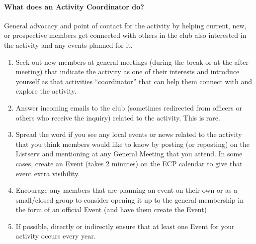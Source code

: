 \documentclass[10pt,a4paper]{article}
\begin{document}
\paragraph{What does an Activity Coordinator do?}
General advocacy and point of contact for the activity by helping current, new, or prospective members
get connected with others in the club also interested in the activity and any events planned for it.
\begin{enumerate}
\item Seek out new members at general meetings (during the break or at the after-meeting) that
indicate the activity as one of their interests and introduce yourself as that activities
“coordinator” that can help them connect with and explore the activity.
\item Answer incoming emails to the club (sometimes redirected from officers or others who receive
the inquiry) related to the activity. This is rare.
\item Spread the word if you see any local events or news related to the activity that you think
members would like to know by posting (or reposting) on the Listserv and mentioning at any
General Meeting that you attend. In some cases, create an Event (takes 2 minutes) on the ECP
calendar to give that event extra visibility.
\item Encourage any members that are planning an event on their own or as a small/closed group to
consider opening it up to the general membership in the form of an official Event (and have
them create the Event)
\item If possible, directly or indirectly ensure that at least one Event for your activity occurs every year.
\end{enumerate}

\end{document}
